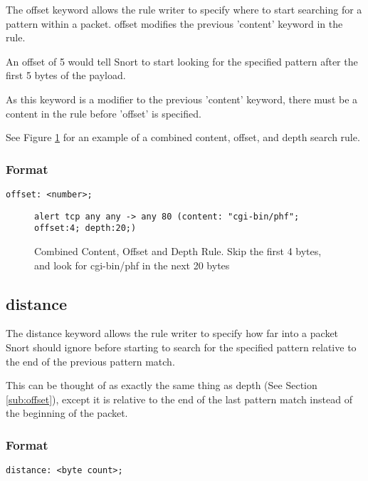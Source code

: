 \documentclass[english]{report}
\begin{document}
The offset keyword allows the rule writer to specify where to start searching
for a pattern within a packet.  offset modifies the previous 'content' keyword
in the rule.

An offset of 5 would tell Snort to start looking for the specified pattern
after the first 5 bytes of the payload.

As this keyword is a modifier to the previous 'content' keyword, there must be
a content in the rule before 'offset' is specified.

See Figure \ref{combined rule with offset and depth} for an example of a
combined content, offset, and depth search rule.

\subsubsection{Format}

\begin{verbatim}
offset: <number>;
\end{verbatim}


\begin{figure}[!hbpt]
\begin{verbatim}
alert tcp any any -> any 80 (content: "cgi-bin/phf"; offset:4; depth:20;)
\end{verbatim}

\caption{\label{combined rule with offset and depth} Combined Content, Offset
and Depth Rule. Skip the first 4 bytes, and look for cgi-bin/phf in the next 20 bytes}
\end{figure}

\subsection{distance\label{sub:Distance}}

The distance keyword allows the rule writer to specify how far into a packet
Snort should ignore before starting to search for the specified pattern
relative to the end of the previous pattern match.  

This can be thought of as exactly the same thing as depth (See Section
\ref{sub:offset}), except it is relative to the end of the last pattern match
instead of the beginning of the packet.

\subsubsection{Format}

\begin{verbatim}
distance: <byte count>;
\end{verbatim}
\end{document}
